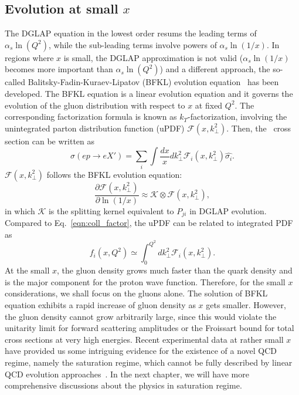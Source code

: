 \subsection{Evolution at small $x$}
The DGLAP equation in the lowest order resums the leading terms of
$\alpha_{s}\ln(Q^{2})$, while the sub-leading terms involve powers of
$\alpha_{s}\ln(1/x)$. In regions where $x$ is small, the DGLAP approximation is
not valid ($\alpha_{s}\ln(1/x)$ becomes more important than
$\alpha_{s}\ln(Q^{2})$) and a different approach, the so-called
Balitsky-Fadin-Kuraev-Lipatov (BFKL) evolution equation~\cite{Balitsky:1978ic}
has been developed. The BFKL equation is a linear evolution equation and it
governs the evolution of the gluon distribution with respect to $x$ at fixed
$Q^{2}$. The corresponding factorization formula is known as
$k_{T}$-factorization, involving the unintegrated parton distribution function
(uPDF) $\mathcal{F}(x,k^{2}_{\perp})$. Then, the \ep\ cross section can be written as
\begin{equation}
\sigma(ep\rightarrow eX')=\sum_{i} \int\frac{dx}{x}dk^{2}_{\perp}\mathcal{F}_{i}(x,k^{2}_{\perp})\hat{\sigma_{i}}.
\end{equation}
$\mathcal{F}(x,k^{2}_{\perp})$ follows the BFKL evolution equation:
\begin{equation}
\frac{\partial \mathcal{F}(x, k^{2}_{\perp})}{\partial \ln(1/x)}\approx \mathcal{K}\otimes \mathcal{F}(x, k^{2}_{\perp}),
\end{equation}
in which $\mathcal{K}$ is the splitting kernel equivalent to $P_{ji}$ in DGLAP evolution.
Compared to Eq.~\ref{eqn:coll_factor}, the uPDF can be related to integrated PDF
as \[f_{i}(x,Q^{2})\simeq \int^{Q^{2}}_{0}dk^{2}_{\perp}\mathcal{F}_{i}(x,k^{2}_{\perp}).\]
At the small $x$, the gluon density grows much faster than the quark density and
is the major component for the proton wave function. Therefore, for the small
$x$ considerations, we shall focus on the gluons alone. The solution of BFKL
equation exhibits a rapid increase of gluon density as $x$ gets smaller.
However, the gluon density cannot grow arbitrarily large, since this would
violate the unitarity limit for forward scattering amplitudes or the Froissart
bound for total cross sections at very high energies. Recent experimental data
at rather small $x$ have provided us some intriguing evidence for the existence
of a novel QCD regime, namely the saturation regime, which cannot be fully
described by linear QCD evolution
approaches~\cite{Stasto:2000er,Armesto:2004ud,Gelis:2010nm}. In the next
chapter, we will have more comprehensive discussions about the physics in
saturation regime.






